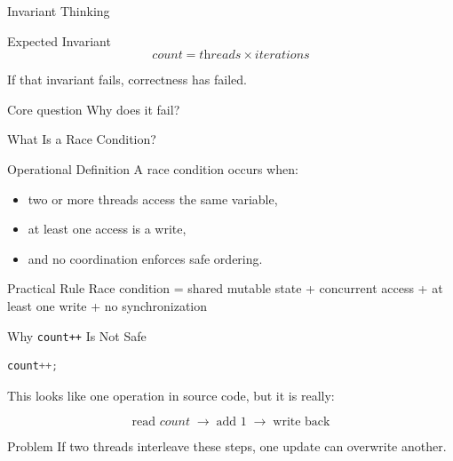 \documentclass[aspectratio=169,11pt]{beamer}
\begin{document}
	\begin{frame}{Invariant Thinking}
		\begin{block}{Expected Invariant}
			\[
			count = \textit{threads} \times \textit{iterations}
			\]
		\end{block}
		
		\bigskip
		If that invariant fails, correctness has failed.
		
		\bigskip
		\begin{alertblock}{Core question}
			Why does it fail?
		\end{alertblock}
	\end{frame}
	
	\begin{frame}{What Is a Race Condition?}
		\begin{block}{Operational Definition}
			A race condition occurs when:
			\begin{itemize}
				\item two or more threads access the same variable,
				\item at least one access is a write,
				\item and no coordination enforces safe ordering.
			\end{itemize}
		\end{block}
		
		\bigskip
		\begin{alertblock}{Practical Rule}
			Race condition = shared mutable state + concurrent access + at least one write + no synchronization
		\end{alertblock}
	\end{frame}
	
	\begin{frame}[fragile]{Why \texttt{count++} Is Not Safe}
		\begin{lstlisting}[language=Java]
			count++;
		\end{lstlisting}
		
		\bigskip
		This looks like one operation in source code, but it is really:
		
		\[
		\text{read } count \;\rightarrow\; \text{add } 1 \;\rightarrow\; \text{write back}
		\]
		
		\bigskip
		\begin{block}{Problem}
			If two threads interleave these steps, one update can overwrite another.
		\end{block}
	\end{frame}
	
\end{document}
